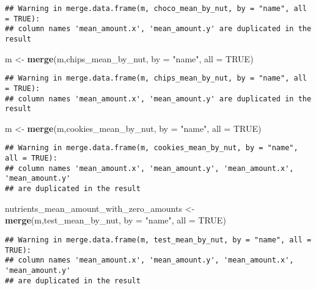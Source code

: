 \documentclass[
]{article}
\newenvironment{Shaded}{\begin{snugshade}}{\end{snugshade}}
\newcommand{\AttributeTok}[1]{\textcolor[rgb]{0.13,0.29,0.53}{#1}}
\newcommand{\ConstantTok}[1]{\textcolor[rgb]{0.56,0.35,0.01}{#1}}
\newcommand{\FunctionTok}[1]{\textcolor[rgb]{0.13,0.29,0.53}{\textbf{#1}}}
\newcommand{\NormalTok}[1]{#1}
\newcommand{\OtherTok}[1]{\textcolor[rgb]{0.56,0.35,0.01}{#1}}
\newcommand{\StringTok}[1]{\textcolor[rgb]{0.31,0.60,0.02}{#1}}
\begin{document}
\begin{verbatim}
## Warning in merge.data.frame(m, choco_mean_by_nut, by = "name", all = TRUE):
## column names 'mean_amount.x', 'mean_amount.y' are duplicated in the result
\end{verbatim}

\begin{Shaded}
\begin{Highlighting}[]
\NormalTok{m }\OtherTok{\textless{}{-}} \FunctionTok{merge}\NormalTok{(m,chips\_mean\_by\_nut, }\AttributeTok{by =} \StringTok{"name"}\NormalTok{, }\AttributeTok{all =} \ConstantTok{TRUE}\NormalTok{)}
\end{Highlighting}
\end{Shaded}

\begin{verbatim}
## Warning in merge.data.frame(m, chips_mean_by_nut, by = "name", all = TRUE):
## column names 'mean_amount.x', 'mean_amount.y' are duplicated in the result
\end{verbatim}

\begin{Shaded}
\begin{Highlighting}[]
\NormalTok{m }\OtherTok{\textless{}{-}} \FunctionTok{merge}\NormalTok{(m,cookies\_mean\_by\_nut, }\AttributeTok{by =} \StringTok{"name"}\NormalTok{, }\AttributeTok{all =} \ConstantTok{TRUE}\NormalTok{)}
\end{Highlighting}
\end{Shaded}

\begin{verbatim}
## Warning in merge.data.frame(m, cookies_mean_by_nut, by = "name", all = TRUE):
## column names 'mean_amount.x', 'mean_amount.y', 'mean_amount.x', 'mean_amount.y'
## are duplicated in the result
\end{verbatim}

\begin{Shaded}
\begin{Highlighting}[]
\NormalTok{nutrients\_mean\_amount\_with\_zero\_amounts }\OtherTok{\textless{}{-}} \FunctionTok{merge}\NormalTok{(m,test\_mean\_by\_nut, }\AttributeTok{by =} \StringTok{"name"}\NormalTok{, }\AttributeTok{all =} \ConstantTok{TRUE}\NormalTok{) }
\end{Highlighting}
\end{Shaded}

\begin{verbatim}
## Warning in merge.data.frame(m, test_mean_by_nut, by = "name", all = TRUE):
## column names 'mean_amount.x', 'mean_amount.y', 'mean_amount.x', 'mean_amount.y'
## are duplicated in the result
\end{verbatim}
\end{document}
